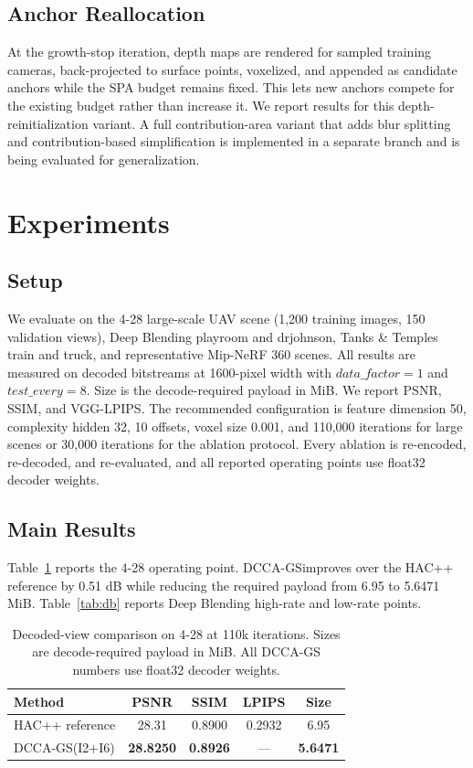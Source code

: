 \documentclass{article}
\newcommand{\DCCA}{DCCA-GS}
\begin{document}
\subsection{Anchor Reallocation}
At the growth-stop iteration, depth maps are rendered for sampled training cameras, back-projected to surface points, voxelized, and appended as candidate anchors while the SPA budget remains fixed. This lets new anchors compete for the existing budget rather than increase it. We report results for this depth-reinitialization variant. A full contribution-area variant that adds blur splitting and contribution-based simplification is implemented in a separate branch and is being evaluated for generalization.

\section{Experiments}

\subsection{Setup}
We evaluate on the 4-28 large-scale UAV scene (1,200 training images, 150 validation views), Deep Blending playroom and drjohnson, Tanks \& Temples train and truck, and representative Mip-NeRF 360 scenes. All results are measured on decoded bitstreams at 1600-pixel width with $data\_factor=1$ and $test\_every=8$. Size is the decode-required payload in MiB. We report PSNR, SSIM, and VGG-LPIPS. The recommended configuration is feature dimension 50, complexity hidden 32, 10 offsets, voxel size 0.001, and 110,000 iterations for large scenes or 30,000 iterations for the ablation protocol. Every ablation is re-encoded, re-decoded, and re-evaluated, and all reported operating points use float32 decoder weights.

\subsection{Main Results}
Table~\ref{tab:main428} reports the 4-28 operating point. \DCCA improves over the HAC++ reference by 0.51 dB while reducing the required payload from 6.95 to 5.6471 MiB. Table~\ref{tab:db} reports Deep Blending high-rate and low-rate points.

\begin{table}[t]
\centering
\caption{Decoded-view comparison on 4-28 at 110k iterations. Sizes are decode-required payload in MiB. All \DCCA{} numbers use float32 decoder weights.}
\label{tab:main428}
\begin{tabular}{lcccc}
\toprule
Method & PSNR & SSIM & LPIPS & Size \\
\midrule
HAC++ reference & 28.31 & 0.8900 & 0.2932 & 6.95 \\
\DCCA (I2+I6) & \textbf{28.8250} & \textbf{0.8926} & --- & \textbf{5.6471} \\%
\bottomrule
\end{tabular}
\end{table}
\end{document}
